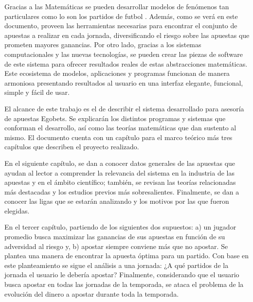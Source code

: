 Gracias a las Matemáticas se pueden desarrollar modelos de fenómenos tan particulares como lo son los partidos de futbol \cite{goddard2005regression}. Además, como se verá en este documento, proveen las herramientas necesarias para encontrar el conjunto de apuestas a realizar en cada jornada, diversificando el riesgo sobre las apuestas que prometen mayores ganancias. Por otro lado, gracias a los sistemas computacionales y las nuevas tecnologías, se pueden crear las piezas de software de este sistema para ofrecer resultados reales de estas abstracciones matemáticas. Este ecosistema de modelos, aplicaciones y programas funcionan de manera armoniosa presentando resultados al usuario en una interfaz elegante, funcional, simple y fácil de usar. 

El alcance de este trabajo es el de describir el sistema desarrollado para asesoría de apuestas Egobets. Se explicarán los distintos programas y sistemas que conforman el desarrollo, así como las teorías matemáticas que dan sustento al mismo. El documento cuenta con un capítulo para el marco teórico más tres capítulos que describen el proyecto realizado.

En el siguiente capítulo, se dan a conocer datos generales de las apuestas que ayudan al lector a comprender la relevancia del sistema en la industria de las apuestas y en el ámbito científico; también, se revisan las teorías relacionadas más destacadas y los estudios previos más sobresalientes. Finalmente, se dan a conocer las ligas que se estarán analizando y los motivos por las que fueron elegidas.


En el tercer capítulo, partiendo de los siguientes dos supuestos: a) un jugador promedio busca maximizar las ganancias de sus apuestas en función de su adversidad al riesgo y, b) apostar siempre conviene más que no apostar. Se plantea una manera de encontrar la apuesta óptima para un partido. Con base en este planteamiento se sigue el análisis a una jornada: ¿A qué partidos de la jornada el usuario le debería apostar? Finalmente, considerando que el usuario busca apostar en todas las jornadas de la temporada, se ataca el problema de la evolución del dinero a apostar durante toda la temporada.


